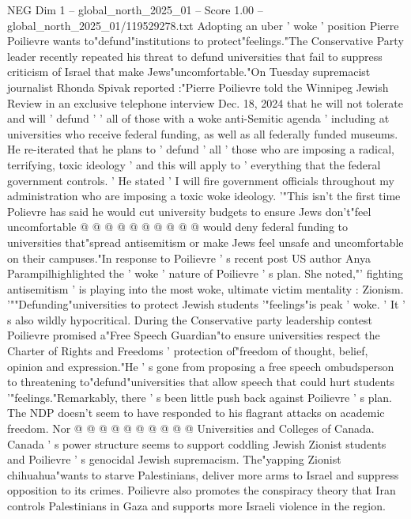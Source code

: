 \begin{textsample}{NEG Dim 1 – global\_north\_2025\_01 – Score 1.00 – global\_north\_2025\_01/119529278.txt}  \label{ex:f1_neg_057}
Adopting an uber ' woke ' position Pierre Poilievre wants to"defund"institutions to protect"feelings."The Conservative Party leader recently repeated his threat to defund universities that fail to suppress criticism of Israel that make Jews"uncomfortable."On Tuesday supremacist journalist Rhonda Spivak reported :"Pierre Poilievre told the Winnipeg Jewish Review in an exclusive telephone interview Dec. 18, 2024 that he will not tolerate and will ' defund ' ' all of those with a woke anti-Semitic agenda ' including at universities who receive federal funding, as well as all federally funded museums.
He re-iterated that he plans to ' defund ' all ' those who are imposing a radical, terrifying, toxic ideology ' and this will apply to ' everything that the federal government controls. ' He stated ' I will fire government officials throughout my administration who are imposing a toxic woke ideology. '"This isn't the first time Polievre has said he would cut university budgets to ensure Jews don't"feel uncomfortable @ @ @ @ @ @ @ @ @ @ would deny federal funding to universities that"spread antisemitism or make Jews feel unsafe and uncomfortable on their campuses."In response to Poilievre ' s recent post US author Anya Parampilhighlighted the ' woke ' nature of Poilievre ' s plan.
She noted,"' fighting antisemitism ' is playing into the most woke, ultimate victim mentality : Zionism. '""Defunding"universities to protect Jewish students '"feelings"is peak ' woke. ' It ' s also wildly hypocritical.
During the Conservative party leadership contest Poilievre promised a"Free Speech Guardian"to ensure universities respect the Charter of Rights and Freedoms ' protection of"freedom of thought, belief, opinion and expression."He ' s gone from proposing a free speech ombudsperson to threatening to"defund"universities that allow speech that could hurt students '"feelings."Remarkably, there ' s been little push back against Poilievre ' s plan.
The NDP doesn't seem to have responded to his flagrant attacks on academic freedom.
Nor @ @ @ @ @ @ @ @ @ @ Universities and Colleges of Canada.
Canada ' s power structure seems to support coddling Jewish Zionist students and Poilievre ' s genocidal Jewish supremacism.
The"yapping Zionist chihuahua"wants to starve Palestinians, deliver more arms to Israel and suppress opposition to its crimes.
Poilievre also promotes the conspiracy theory that Iran controls Palestinians in Gaza and supports more Israeli violence in the region.

\end{textsample}
